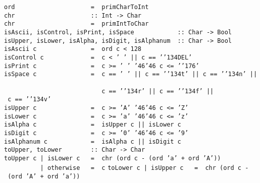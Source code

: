 \mbox{\tt ord\ \ \ \ \ \ \ \ \ \ \ \ \ \ \ \ \ \ \ \ \ =\ \ primCharToInt}
%
\eprogB\noindent\bprogB
\mbox{\tt chr\ \ \ \ \ \ \ \ \ \ \ \ \ \ \ \ \ \ \ \ \ ::\ Int\ ->\ Char}\\
\mbox{\tt chr\ \ \ \ \ \ \ \ \ \ \ \ \ \ \ \ \ \ \ \ \ =\ \ primIntToChar}
%
\eprogB\noindent\bprogB
\mbox{\tt isAscii,\ isControl,\ isPrint,\ isSpace\ \ \ \ \ \ \ \ \ \ \ \ ::\ Char\ ->\ Bool}\\
\mbox{\tt isUpper,\ isLower,\ isAlpha,\ isDigit,\ isAlphanum\ \ ::\ Char\ ->\ Bool}
%
%
%
%
%
%
%
%
%
\eprogB\noindent\bprogB
\mbox{\tt isAscii\ c\ \ \ \ \ \ \ \ \ \ \ \ \ \ \ =\ \ ord\ c\ <\ 128}\\
\mbox{\tt isControl\ c\ \ \ \ \ \ \ \ \ \ \ \ \ =\ \ c\ <\ '\ '\ ||\ c\ ==\ '{\char'134}DEL'}\\
\mbox{\tt isPrint\ c\ \ \ \ \ \ \ \ \ \ \ \ \ \ \ =\ \ c\ >=\ '\ '\ {\char'46}{\char'46}\ c\ <=\ '{\char'176}'}\\
\mbox{\tt isSpace\ c\ \ \ \ \ \ \ \ \ \ \ \ \ \ \ =\ \ c\ ==\ '\ '\ ||\ c\ ==\ '{\char'134}t'\ ||\ c\ ==\ '{\char'134}n'\ ||\ }\\
\mbox{\tt \ \ \ \ \ \ \ \ \ \ \ \ \ \ \ \ \ \ \ \ \ \ \ \ \ \ \ c\ ==\ '{\char'134}r'\ ||\ c\ ==\ '{\char'134}f'\ ||\ c\ ==\ '{\char'134}v'}\\
\mbox{\tt isUpper\ c\ \ \ \ \ \ \ \ \ \ \ \ \ \ \ =\ \ c\ >=\ 'A'\ {\char'46}{\char'46}\ c\ <=\ 'Z'}\\
\mbox{\tt isLower\ c\ \ \ \ \ \ \ \ \ \ \ \ \ \ \ =\ \ c\ >=\ 'a'\ {\char'46}{\char'46}\ c\ <=\ 'z'}\\
\mbox{\tt isAlpha\ c\ \ \ \ \ \ \ \ \ \ \ \ \ \ \ =\ \ isUpper\ c\ ||\ isLower\ c}\\
\mbox{\tt isDigit\ c\ \ \ \ \ \ \ \ \ \ \ \ \ \ \ =\ \ c\ >=\ '0'\ {\char'46}{\char'46}\ c\ <=\ '9'}\\
\mbox{\tt isAlphanum\ c\ \ \ \ \ \ \ \ \ \ \ \ =\ \ isAlpha\ c\ ||\ isDigit\ c}
\eprogB\noindent\bprogB
\mbox{\tt toUpper,\ toLower\ \ \ \ \ \ \ \ ::\ Char\ ->\ Char}\\
\mbox{\tt toUpper\ c\ |\ isLower\ c\ \ \ =\ \ chr\ (ord\ c\ -\ (ord\ 'a'\ +\ ord\ 'A'))}\\
\mbox{\tt \ \ \ \ \ \ \ \ \ \ |\ otherwise\ \ \ =\ \ c}
%
%
\eprogB\noindent\bprogB
\mbox{\tt toLower\ c\ |\ isUpper\ c\ \ \ =\ \ chr\ (ord\ c\ -\ (ord\ 'A'\ +\ ord\ 'a'))}\\
